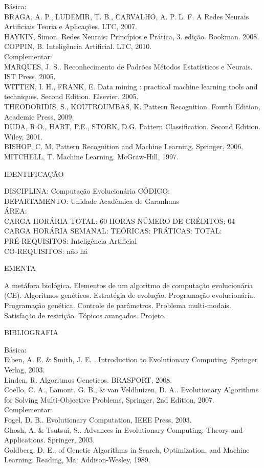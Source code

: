 \documentclass[
	12pt,				%
	openright,			%
  oneside,     %
	a4paper,			%
	english,			%
	french,				%
	spanish,			%
	brazil				%
	]{abntex2}
\begin{document}
\begin{apendicesenv}
Básica:\\
BRAGA, A. P., LUDEMIR, T. B., CARVALHO, A. P. L. F. A Redes Neurais Artificiais  Teoria e Aplicações. LTC, 2007.\\
HAYKIN, Simon. Redes Neurais: Princípios e Prática, 3. edição. Bookman.
2008.\\
COPPIN, B. Inteligência Artificial. LTC, 2010.\\
Complementar:\\
MARQUES, J. S.. Reconhecimento de Padrões  Métodos Estatísticos e Neurais. IST Press, 2005.\\
WITTEN, I. H., FRANK, E. Data mining : practical machine learning tools and techniques. Second Edition. Elsevier, 2005.\\
THEODORIDIS, S., KOUTROUMBAS, K. Pattern Recognition. Fourth Edition, Academic Press, 2009.\\
DUDA, R.O., HART, P.E., STORK, D.G. Pattern Classification. Second Edition. Wiley, 2001.\\
BISHOP, C. M. Pattern Recognition and Machine Learning. Springer, 2006.\\
MITCHELL, T. Machine Learning. McGraw-Hill, 1997.

\newpage IDENTIFICAÇÃO

DISCIPLINA: Computação Evolucionária CÓDIGO:\\ 
DEPARTAMENTO: Unidade Acadêmica de Garanhuns\\
ÁREA: \\
CARGA HORÁRIA TOTAL: 60 HORAS NÚMERO DE CRÉDITOS: 04\\
CARGA HORÁRIA SEMANAL: TEÓRICAS: PRÁTICAS: TOTAL: \\
PRÉ-REQUISITOS: Inteligência Artificial\\
CO-REQUISITOS: não há

EMENTA 

A metáfora biológica. Elementos de um algoritmo de computação
evolucionária (CE). Algoritmos genéticos. Estratégia de evolução. Programação evolucionária. Programação genética. Controle de
parâmetros. Problema multi-modais. Satisfação de restrição. Tópicos avançados. Projeto.

BIBLIOGRAFIA 

Básica:\\
Eiben, A. E. \& Smith, J. E. . Introduction to Evolutionary Computing.
Springer Verlag, 2003.\\
Linden, R. Algoritmos Geneticos. BRASPORT, 2008.\\
Coello, C. A., Lamont, G. B., \& van Veldhuizen, D. A.. Evolutionary
Algorithms for Solving Multi-Objective Problems, Springer, 2nd Edition,
2007.\\
Complementar:\\
Fogel, D. B.. Evolutionary Computation, IEEE Press, 2003.\\
Ghosh, A. \& Tsutsui, S.. Advances in Evolutionary Computing: Theory and
Applications. Springer, 2003.\\
Goldberg, D. E.. of Genetic Algorithms in Search, Optimization, and
Machine Learning. Reading, Ma: Addison-Wesley, 1989.


\end{apendicesenv}
\end{document}
